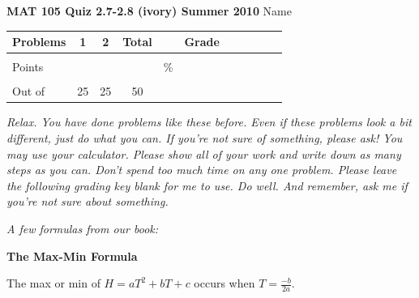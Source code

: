 \documentclass[11pt]{article}
\begin{document}
{\bf MAT 105 Quiz 2.7-2.8 (ivory) Summer 2010} \hspace{.4in} {\large Name} \hrulefill

\hrulefill


\begin{center}

\begin{tabular}
{|l|c|c|c|c|c|c|c|c|c|c|} \hline

 Problems & \hspace{5 pt} 1 \hspace{5 pt}  & \hspace{5 pt} 2 \hspace{5 pt} &  \hspace{5 pt} Total  \hspace{5 pt} & &  \hspace{5 pt} Grade \hspace{5 pt}  \\ \hline
&&& &&\\  
Points &&& &    \hspace{.8in}\% &  \\ 
&&& && \\  \hline
Out of & 25 & 25  &50 & & \\ \hline

\end {tabular}
 
\end{center}

 \emph{Relax.  You have done problems like these before.  Even if these problems look a bit different, just do what you can.  If you're not sure of something, please ask! You may use your calculator.  Please show all of your work and write down as many steps as you can.  Don't spend too much time on any one problem.  Please leave the following grading key blank for me to use.  Do well.  And remember, ask me if you're not sure about something.}
 
 \vspace{.1in}
 
 \emph{A few formulas from our book:}
  \vspace{.2in}
 
  \begin{center}
\textbf{The Max-Min Formula}
\vspace{.1in}

The max or min of $H=aT^2+bT+c$ occurs when $\displaystyle T=\frac{-b}{2a}$.

 \end{center}
 
\end{document}
